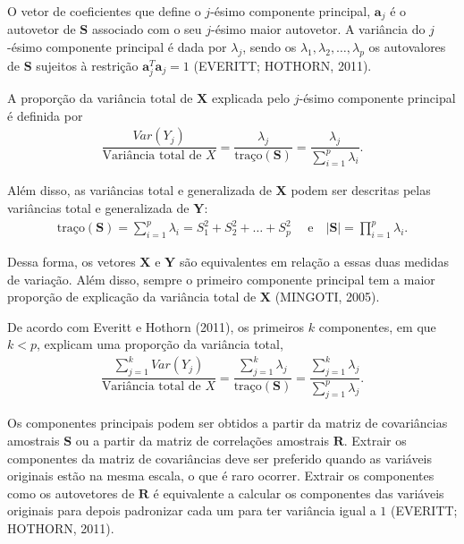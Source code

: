 \documentclass[12pt, a4paper,brazil,oneside]{article}
\begin{document}
	O vetor de coeficientes que define o $j$-ésimo componente principal, $\boldsymbol{a}_j$ é o autovetor de $\boldsymbol{S}$ associado com o seu $j$-ésimo maior autovetor. A variância do $j$-ésimo componente principal é dada por $\lambda_j$, sendo os $\lambda_1, \lambda_2, \dots, \lambda_p$ os autovalores de $\boldsymbol{S}$ sujeitos à restrição $\boldsymbol{a}_j^T\boldsymbol{a}_j = 1$ (EVERITT; HOTHORN, 2011).
	
	A proporção da variância total de $\boldsymbol{X}$ explicada pelo $j$-ésimo componente principal é definida por
	\begin{align*}
	\dfrac{Var(Y_j)}{\textrm{Variância total de } X} = \dfrac{\lambda_j}{\textrm{traço}(\boldsymbol{S})} = \dfrac{\lambda_j}{\displaystyle\sum_{i=1}^{p}\lambda_i}.
	\end{align*}
	
	Além disso, as variâncias total e generalizada de $\boldsymbol{X}$ podem ser descritas pelas variâncias total e generalizada de $\boldsymbol{Y}$:
	\begin{align*}
	\textrm{traço}(\boldsymbol{S}) = \displaystyle\sum_{i=1}^{p}\lambda_i = S_1^2 + S_2^2 + \dots + S_p^2 \quad \textrm{ e} \quad |\boldsymbol{S}| = \prod_{i=1}^{p}\lambda_i.
	\end{align*}
	
	Dessa forma, os vetores $\boldsymbol{X}$ e $\boldsymbol{Y}$ são equivalentes em relação a essas duas medidas de variação. Além disso, sempre o primeiro componente principal tem a maior proporção de explicação da variância total de $\boldsymbol{X}$ (MINGOTI, 2005).
	
	De acordo com Everitt e Hothorn (2011), os primeiros $k$ componentes, em que $k < p$, explicam uma proporção da variância total,
	\begin{align*}
	\dfrac{\displaystyle\sum_{j=1}^{k}Var(Y_j)}{\textrm{Variância total de } X} = \dfrac{\displaystyle\sum_{j=1}^{k}\lambda_j}{\textrm{traço}(\boldsymbol{S})} = \dfrac{\displaystyle\sum_{j=1}^{k}\lambda_j}{\displaystyle\sum_{j=1}^{p}\lambda_j}.
	\end{align*}
	
	Os componentes principais podem ser obtidos a partir da matriz de covariâncias amostrais $\boldsymbol{S}$ ou a partir da matriz de correlações amostrais $\boldsymbol{R}$. Extrair os componentes da matriz de covariâncias deve ser preferido quando as variáveis originais estão na mesma escala, o que é raro ocorrer. Extrair os componentes como os autovetores de $\boldsymbol{R}$ é equivalente a calcular os componentes das variáveis originais para depois padronizar cada um para ter variância igual a $1$ (EVERITT; HOTHORN, 2011).
	
\end{document}
